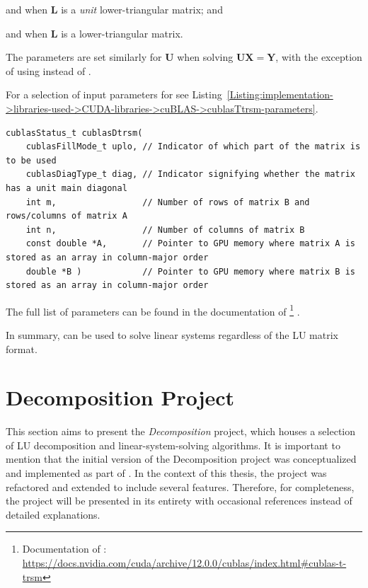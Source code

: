 \begin{tight_itemize}
	\item {} and  when $\mathbf{L}$ is a \textit{unit} lower-triangular matrix; and
	\item {} and  when $\mathbf{L}$ is a lower-triangular matrix.
\end{tight_itemize}

The parameters are set similarly for $\mathbf{U}$ when solving $\mathbf{UX}=\mathbf{Y}$, with the exception of using  instead of .

For a selection of input parameters for  see Listing~\ref{Listing:implementation->libraries-used->CUDA-libraries->cuBLAS->cublasTtrsm-parameters}.

\begin{lstlisting}[caption={The function declaration of \code{cublasDtrsm()} with a selection of parameters.},label={Listing:implementation->libraries-used->CUDA-libraries->cuBLAS->cublasTtrsm-parameters}]
cublasStatus_t cublasDtrsm(
	cublasFillMode_t uplo, // Indicator of which part of the matrix is to be used
	cublasDiagType_t diag, // Indicator signifying whether the matrix has a unit main diagonal
	int m,                 // Number of rows of matrix B and rows/columns of matrix A
	int n,                 // Number of columns of matrix B
	const double *A,       // Pointer to GPU memory where matrix A is stored as an array in column-major order
	double *B )            // Pointer to GPU memory where matrix B is stored as an array in column-major order
\end{lstlisting}

The full list of parameters can be found in the documentation of \footnote{Documentation of : \url{https://docs.nvidia.com/cuda/archive/12.0.0/cublas/index.html\#cublas-t-trsm}} \cite{h9oJtLLHaTFaL3ME}.

In summary,  can be used to solve linear systems regardless of the LU matrix format.




\section{Decomposition Project}\label{Section:implementation->decomposition-project}
This section aims to present the \textit{Decomposition} project,  which houses a selection of LU decomposition and linear-system-solving algorithms.
It is important to mention that the initial version of the Decomposition project was conceptualized and implemented as part of  \cite{Cejka2022}.
In the context of this thesis, the project was refactored and extended to include several features.
Therefore, for completeness, the project will be presented in its entirety with occasional references instead of detailed explanations.

